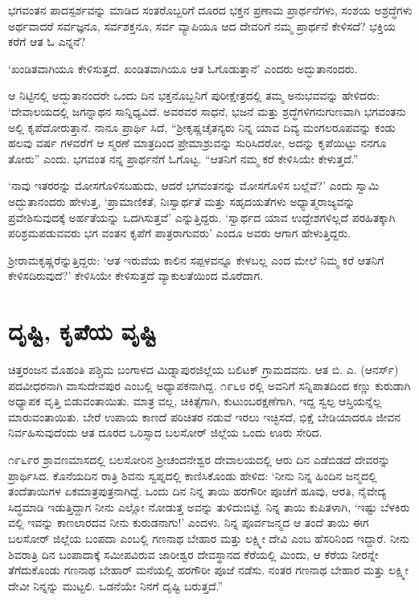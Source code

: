 ಭಗವಂತನ ಪಾದಸ್ಪರ್ಶವನ್ನು ಮಾಡಿದ ಸಂತರೊಬ್ಬರಿಗೆ ದೂರದ ಭಕ್ತನ ಪ್ರಣಾಮ ಪ್ರಾರ್ಥನೆಗಳು, ಸಂಶಯ ಅಶ್ರದ್ಧೆಗಳು ಅರ್ಥವಾದರೆ ಸರ್ವಜ್ಞನೂ, ಸರ್ವಶಕ್ತನೂ, ಸರ್ವ ವ್ಯಾಪಿಯೂ ಆದ ದೇವರಿಗೆ ನಮ್ಮ ಪ್ರಾರ್ಥನೆ ಕೇಳಿಸದೆ? ಭಕ್ತಿಯ ಕರೆಗೆ ಆತ ಓ ಎನ್ನನೆ?

‘ಖಂಡಿತವಾಗಿಯೂ ಕೇಳಿಸುತ್ತದೆ. ಖಂಡಿತವಾಗಿಯೂ ಆತ ಓಗೊಡುತ್ತಾನೆ’ ಎಂದರು ಅದ್ಭುತಾನಂದರು.

ಆ ನಿಟ್ಟಿನಲ್ಲಿ ಅದ್ಭುತಾನಂದರೇ ಒಂದು ದಿನ ಭಕ್ತನೊಬ್ಬನಿಗೆ ಪುರೀಕ್ಷೇತ್ರದಲ್ಲಿ ತಮ್ಮ ಅನುಭವವನ್ನು ಹೇಳಿದರು: ‘ದೇವಾಲಯದಲ್ಲಿ ಜಗನ್ನಾಥನ ಸಾನ್ನಿಧ್ಯವಿದೆ. ಅವರವರ ಸಾಧನೆ, ಭಜನೆ ಮತ್ತು ಶ್ರದ್ಧೆಗಳಿಗನುಗುಣವಾಗಿ ಭಗವಂತನು ಅಲ್ಲಿ ಕೃಪೆದೋರುತ್ತಾನೆ. ನಾನೂ ಪ್ರಾರ್ಥಿ ಸಿದೆ, “ಶ‍್ರೀಕೃಷ್ಣಚೈತನ್ಯರು ನಿನ್ನ ಯಾವ ದಿವ್ಯ ಮಂಗಲರೂಪವನ್ನು ಕಂಡು ಹಲವು ವರ್ಷ ಗಳವರೆಗೆ ಆ ಸ್ಮರಣೆ ಮಾತ್ರದಿಂದ ಪ್ರೇಮಾಶ್ರುವನ್ನು ಸುರಿಸಿದರೋ, ಅದನ್ನು ಕೃಪೆಯಿಟ್ಟು ನನಗೂ ತೋರು” ಎಂದು. ಭಗವಂತ ನನ್ನ ಪ್ರಾರ್ಥನೆಗೆ ಓಗೊಟ್ಟ. “ಆತನಿಗೆ ನಮ್ಮ ಕರೆ ಕೇಳಿಸಿಯೇ ಕೇಳುತ್ತದೆ.”

‘ನಾವು ಇತರರನ್ನು ಮೋಸಗೊಳಿಸಬಹುದು, ಆದರೆ ಭಗವಂತನನ್ನು ಮೋಸಗೊಳಿಸ ಬಲ್ಲೆವೆ?’ ಎಂದು ಸ್ವಾಮಿ ಅದ್ಭುತಾನಂದರು ಹೇಳುತ್ತ, ‘ಪ್ರಾಮಾಣಿಕತೆ, ನಿಃಸ್ವಾರ್ಥತೆ ಮತ್ತು ಸಹೃದಯತೆಗಳು ಅಧ್ಯಾತ್ಮರಾಜ್ಯವನ್ನು ಪ್ರವೇಶಿಸುವುದಕ್ಕೆ ಅರ್ಹತೆಯನ್ನು ಒದಗಿಸುತ್ತವೆ’ ಎನ್ನುತ್ತಿದ್ದರು. ‘ಸ್ವಾರ್ಥದ ಯಾವ ಉದ್ದೇಶಗಳಿಲ್ಲದೆ ಪರಹಿತಕ್ಕಾಗಿ ಪರಿಶ್ರಮಪಡುವವರು ಭಗ ವಂತನ ಕೃಪೆಗೆ ಪಾತ್ರರಾಗುವರು’ ಎಂದೂ ಅವರು ಆಗಾಗ ಹೇಳುತ್ತಿದ್ದರು.

ಶ‍್ರೀರಾಮಕೃಷ್ಣರೆನ್ನುತ್ತಿದ್ದರು: ‘ಆತ ಇರುವೆಯ ಕಾಲಿನ ಸಪ್ಪಳವನ್ನೂ ಕೇಳಬಲ್ಲ ಎಂದ ಮೇಲೆ ನಿಮ್ಮ ಕರೆ ಆತನಿಗೆ ಕೇಳಿಸದಿರುವುದೆ?’ ಕೇಳಿಸಿಯೇ ಕೇಳಿಸುತ್ತದೆ ವ್ಯಾಕುಲತೆಯಿಂದ ಮೊರೆದಾಗ.


\section{ದೃಷ್ಟಿ, ಕೃಪೆಯ ವೃಷ್ಟಿ}

ಚಿತ್ತರಂಜನ ಮೊಹಂತಿ ಪಶ್ಚಿಮ ಬಂಗಾಳದ ಮಿಡ್ನಾಪುರಜಿಲ್ಲೆಯ ಬಲಿಟಕ್ ಗ್ರಾಮದವನು. ಆತ ಬಿ. ಎ. (ಆನರ್ಸ್​) ಪದವೀಧರನಾಗಿ ವಾಸುದೇವಪುರ ಎಂಬಲ್ಲಿ ಅಧ್ಯಾಪಕನಾಗಿದ್ದ. ೧೯೬೮ ರಲ್ಲಿ ಅವನಿಗೆ ಸನ್ನಿಪಾತದಿಂದ ಕಣ್ಣು ಕುರುಡಾಗಿ ಅಧ್ಯಾಪಕ ವೃತ್ತಿ ಬಿಡುವಂತಾಯಿತು. ಮಾತ್ರ ವಲ್ಲ, ಚಿಕಿತ್ಸೆಗಾಗಿ, ಕುಟುಂಬರಕ್ಷಣೆಗಾಗಿ, ಇದ್ದ ಸ್ವಲ್ಪ ಆಸ್ತಿಯನ್ನೆಲ್ಲ ಮಾರುವಂತಾಯಿತು. ಬೇರೆ ಉಪಾಯ ಕಾಣದೆ ಪರಿಚಿತರ ನಡುವೆ ಇರಲು ಇಚ್ಛಿಸದೆ, ಭಿಕ್ಷೆ ಬೇಡಿಯಾದರೂ ಜೀವನ ನಿರ್ವಹಿಸುವುದೆಂದು ಆತ ದೂರದ ಒರಿಸ್ಸಾದ ಬಲಸೋರ್ ಜಿಲ್ಲೆಯ ಒಂದು ಊರು ಸೇರಿದ.

೧೯೬೯ರ ಶ್ರಾವಣಮಾಸದಲ್ಲಿ ಬಲಸೋರಿನ ಶ‍್ರೀಚಂದನೇಶ್ವರ ದೇವಾಲಯದಲ್ಲಿ ಆರು ದಿನ ಎಡೆಬಿಡದೆ ದೇವರನ್ನು ಪ್ರಾರ್ಥಿಸಿದ. ಕೊನೆಯದಿನ ರಾತ್ರಿ ಶಿವನು ಸ್ವಪ್ನದಲ್ಲಿ ಕಾಣಿಸಿಕೊಂಡು ಹೇಳಿದ: ‘ನೀನು ನಿನ್ನ ಹಿಂದಿನ ಜನ್ಮದಲ್ಲಿ ತಂದೆತಾಯಿಗಳ ಏಕಮಾತ್ರಪುತ್ರನಾಗಿದ್ದೆ. ಒಂದು ದಿನ ನಿನ್ನ ತಾಯಿ ಹರಗೌರೀ ಪೂಜೆಗೆ ಹೂವು, ಆರತಿ, ನೈವೇದ್ಯ ಸಿದ್ಧಮಾಡಿ ಇಡುತ್ತಿದ್ದಾಗ ನೀನು ಎಲ್ಲೋ ನೋಡುತ್ತ ಅವನ್ನು ತುಳಿದುಬಿಟ್ಟೆ. ನಿನ್ನ ತಾಯಿ ಕುಪಿತಳಾಗಿ, ‘ಇಷ್ಟು ಬೆಳಕಿರು ವಲ್ಲಿ ಇವನ್ನು ಕಾಣಲಾರದವ ನೀನು ಕುರುಡನಾಗು!’ ಎಂದಳು. ನಿನ್ನ ಪೂರ್ವಜನ್ಮದ ಆ ತಂದೆ ತಾಯಿ ಈಗ ಬಲಸೋರ್ ಜಿಲ್ಲೆಯ ಬಂಪದಾ ಎಂಬಲ್ಲಿ ಗಣನಾಥ ಬೇಹಾರ ಮತ್ತು ಲಕ್ಷ್ಮೀ ದೇವಿ ಎಂಬ ಹೆಸರಿನಿಂದ ಇದ್ದಾರೆ. ನೀನು ಶಿವರಾತ್ರಿ ದಿನ ಬಂಪಾದಾಕ್ಕೆ ಸಮೀಪವಿರುವ ಜಾರೀಶ್ವರ ದೇವಸ್ಥಾನದ ಕೆರೆಯಲ್ಲಿ ಮಿಂದು, ಆ ಕೆರೆಯ ನೀರನ್ನೇ ತೆಗೆದುಕೊಂಡು ಗಣನಾಥ ಬೇಹಾರ್ ಮನೆಯಲ್ಲಿ ಹರಗೌರೀ ಪೂಜೆ ನಡೆಸು. ನಂತರ ಗಣನಾಥ ಬೇಹಾರ ಮತ್ತು ಲಕ್ಷ್ಮೀ ದೇವೀ ನಿನ್ನನ್ನು ಮುಟ್ಟಲಿ. ಒಡನೆಯೇ ನಿನಗೆ ದೃಷ್ಟಿ ಬರುತ್ತದೆ.”

